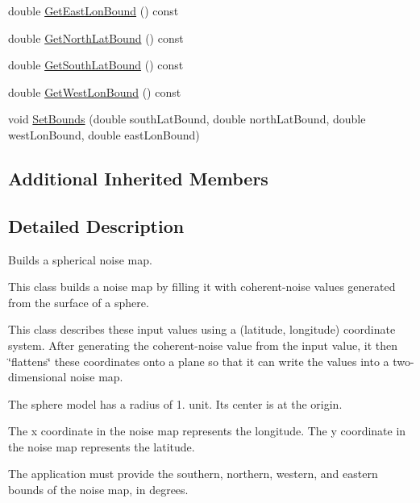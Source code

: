 \begin{DoxyCompactItemize}
\item 
double \hyperlink{classnoise_1_1utils_1_1_noise_map_builder_sphere_a147b825ed70509ae4915cf58dcbc5849}{Get\+East\+Lon\+Bound} () const 
\item 
double \hyperlink{classnoise_1_1utils_1_1_noise_map_builder_sphere_a3a57e009f39f48a464ea0edc2beb4241}{Get\+North\+Lat\+Bound} () const 
\item 
double \hyperlink{classnoise_1_1utils_1_1_noise_map_builder_sphere_a8a4c78a1a4d6b659e721fabdf3f5f47f}{Get\+South\+Lat\+Bound} () const 
\item 
double \hyperlink{classnoise_1_1utils_1_1_noise_map_builder_sphere_aef51b39b7fbd0a010e17e47bff877ae1}{Get\+West\+Lon\+Bound} () const 
\item 
void \hyperlink{classnoise_1_1utils_1_1_noise_map_builder_sphere_ad2f19622ba12bc8ee715b2d070bfaf09}{Set\+Bounds} (double south\+Lat\+Bound, double north\+Lat\+Bound, double west\+Lon\+Bound, double east\+Lon\+Bound)
\end{DoxyCompactItemize}
\subsection*{Additional Inherited Members}


\subsection{Detailed Description}
Builds a spherical noise map.

This class builds a noise map by filling it with coherent-\/noise values generated from the surface of a sphere.

This class describes these input values using a (latitude, longitude) coordinate system. After generating the coherent-\/noise value from the input value, it then \char`\"{}flattens\char`\"{} these coordinates onto a plane so that it can write the values into a two-\/dimensional noise map.

The sphere model has a radius of 1. unit. Its center is at the origin.

The x coordinate in the noise map represents the longitude. The y coordinate in the noise map represents the latitude.

The application must provide the southern, northern, western, and eastern bounds of the noise map, in degrees. 


